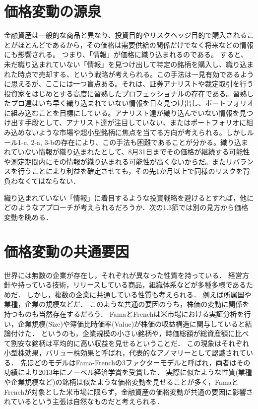 \documentclass[11pt]{jreport}
\begin{document}
\section{価格変動の源泉}
金融資産は一般的な商品と異なり、投資目的やリスクヘッジ目的で購入されることがほとんどであるから，その価格は需要供給の関係だけでなく将来などの情報にも影響される。
つまり、「情報」が価格に織り込まれるのである。
すると、未だ織り込まれていない「情報」を見つけ出して特定の銘柄を購入し、織り込まれた時点で売却する、という戦略が考えられる。この手法は一見有効であるように思えるが、ここには一つ盲点ある。それは、証券アナリストや裁定取引を行う投資家をはじめとする高度に習熟したプロフェッショナルの存在である。習熟したプロ達はいち早く織り込まれていない情報を日々見つけ出し、ポートフォリオに組み込むことを目標にしている。アナリスト達が織り込んでいない情報を見つけ出す手段として、アナリスト達が注目していない、またはポートフォリオに組み込めないような市場や超小型銘柄に焦点を当てる方向が考えられる。しかしルール1-c, 2-a, 3-bの存在により、この手法も困難であることが分かる。織り込まれていない情報が織り込まれたとして、8月31日までその価格が継続する可能性や測定期間内にその情報が織り込まれる可能性が高くないからだ。またリバランスを行うことにより利益を確定させても，その先1か月以上で同様のリスクを背負わなくてはならない．

織り込まれていない「情報」に着目するような投資戦略を避けるとすれば，他にどのようなアプローチが考えられるだろうか．次の1.3節では別の見方から価格変動を眺める．
　
\section{価格変動の共通要因}
世界には無数の企業が存在し，それぞれが異なった性質を持っている．
経営方針や持っている技術，リリースしている商品，組織体系などが多種多様であるためだ．
しかし，複数の企業に共通している性質も考えられる．
例えば所属国や業種，企業の規模などだ．
このような共通の要因のうち，株価の変動に関係を持つものも当然存在するだろう．
FamaとFrenchは米市場における実証分析を行い，企業規模(Size)や簿価比時価率(Value)が株価の収益構造に関与していると結論付けた．
というのも，企業規模の小さい銘柄や，時価総額が総資産額に比べて割安な銘柄は平均的に高い収益を見せるということだ．
この現象はそれぞれ小型株効果，バリュー株効果と呼ばれ，代表的なアノマリーとして認識されている．
先ほどのモデルはFama-Frenchの3ファクターモデルと呼ばれ，両者はその功績により2013年にノーベル経済学賞を受賞した．
実際に似たような性質(業種や企業規模など)の銘柄は似たような価格変動を見せることが多く，FamaとFrenchが対象とした米市場に限らず，金融資産の価格変動が共通の要因に影響されているという主張は自然なものだと考えられる．
\end{document}
